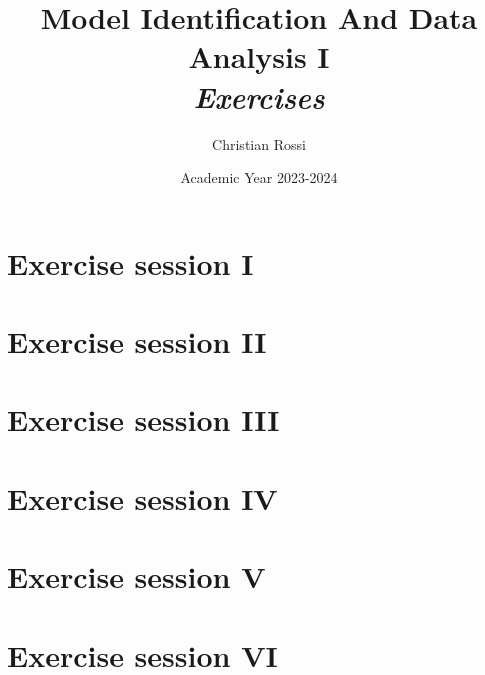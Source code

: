 \documentclass[12pt, a4paper]{report}
\title{Model Identification And Data Analysis I \\ \textit{Exercises}}
\author{Christian Rossi}
\date{Academic Year 2023-2024}
\begin{document}
    \maketitle

    

    \cleardoublepage

    \tableofcontents

    \cleardoublepage

    \chapter{Exercise session I}
    
    
    

    \chapter{Exercise session II}
    
    
    

    \chapter{Exercise session III}
    
    
    

    \chapter{Exercise session IV}
    
    
    
    

    \chapter{Exercise session V}
    

    \chapter{Exercise session VI}
\end{document}
